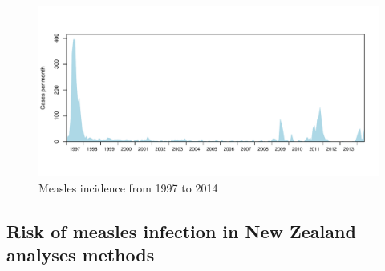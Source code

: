 \documentclass{article}
\begin{document}
\begin{itemize}
\begin{figure}
     \centering
     \includegraphics[width=1\textwidth]{incidence_1997_2014.pdf}
     \caption{Measles incidence from 1997 to 2014}
     \label{fig:incidence1997}
\end{figure}

\subsection{Risk of measles infection in New Zealand analyses methods}


\end{itemize}
\end{document}
